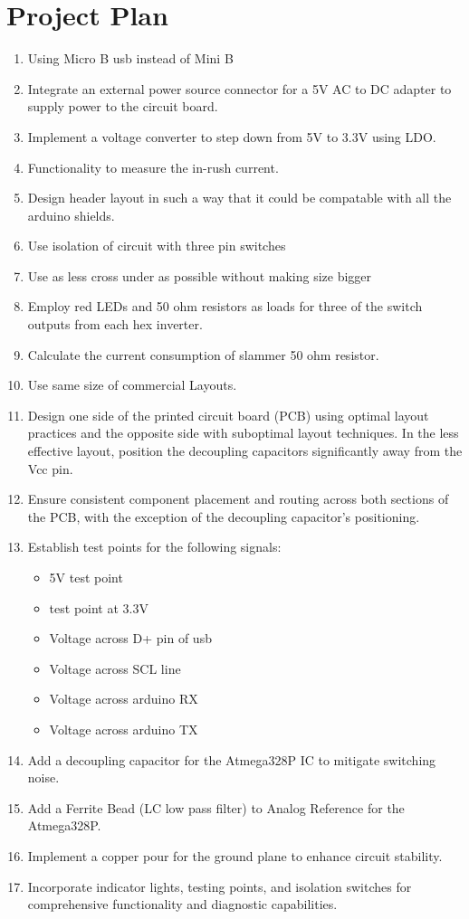 \documentclass[a4paper,11pt]{article}%
\begin{document}
\section{Project Plan}
\begin{enumerate}
	\item Using Micro B usb instead of Mini B
	\item Integrate an external power source connector for a 5V AC to DC adapter to supply power to the circuit board.
	\item Implement a voltage converter to step down from 5V to 3.3V using LDO.
	\item Functionality to measure the in-rush current.
	\item Design header layout in such a way that it could be compatable with all the arduino shields.
	\item Use isolation of circuit with three pin switches
	\item Use as less cross under as possible without making size bigger
	\item Employ red LEDs and 50 ohm resistors as loads for three of the switch outputs from each hex inverter.
	\item Calculate the current consumption of slammer 50 ohm resistor.
	\item Use same size of commercial Layouts.
	\item Design one side of the printed circuit board (PCB) using optimal layout practices and the opposite side with suboptimal layout techniques. In the less effective layout, position the decoupling capacitors significantly away from the Vcc pin.
	\item  Ensure consistent component placement and routing across both sections of the PCB, with the exception of the decoupling capacitor's positioning.
	\item  Establish test points for the following signals:
	      \begin{itemize}
		      \item 5V test point
		      \item test point at 3.3V
		      \item Voltage across D+ pin of usb
		      \item Voltage across SCL line
		      \item Voltage across arduino RX
		      \item Voltage across arduino TX
	      \end{itemize}

	\item Add a decoupling capacitor for the Atmega328P IC to mitigate switching noise.
	\item Add a Ferrite Bead (LC low pass filter) to Analog Reference for the Atmega328P.
	\item Implement a copper pour for the ground plane to enhance circuit stability.
	\item Incorporate indicator lights, testing points, and isolation switches for comprehensive functionality and diagnostic capabilities.
\end{enumerate}
\end{document}
